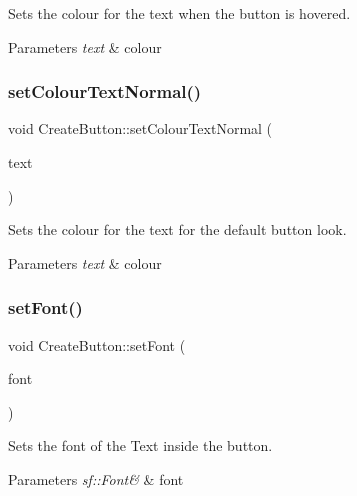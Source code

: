 Sets the colour for the text when the button is hovered. 


\begin{DoxyParams}{Parameters}
{\em text} & colour \\
\hline
\end{DoxyParams}
\mbox{\label{class_create_button_a57b583da73b25e161af5a951aa7213c5}} 
\subsubsection{\texorpdfstring{set\+Colour\+Text\+Normal()}{setColourTextNormal()}}
{\footnotesize\ttfamily void Create\+Button\+::set\+Colour\+Text\+Normal (\begin{DoxyParamCaption}\item[{sf\+::\+Color}]{text }\end{DoxyParamCaption})}



Sets the colour for the text for the default button look. 


\begin{DoxyParams}{Parameters}
{\em text} & colour \\
\hline
\end{DoxyParams}
\mbox{\label{class_create_button_a48f90af032bd58935896f6c18ddcfe04}} 
\subsubsection{\texorpdfstring{set\+Font()}{setFont()}}
{\footnotesize\ttfamily void Create\+Button\+::set\+Font (\begin{DoxyParamCaption}\item[{sf\+::\+Font \&}]{font }\end{DoxyParamCaption})}



Sets the font of the Text inside the button. 


\begin{DoxyParams}{Parameters}
{\em sf\+::\+Font\&} & font \\
\hline
\end{DoxyParams}
\mbox{\label{class_create_button_a4ac68361b9c687e37171ad075b75968a}} 
